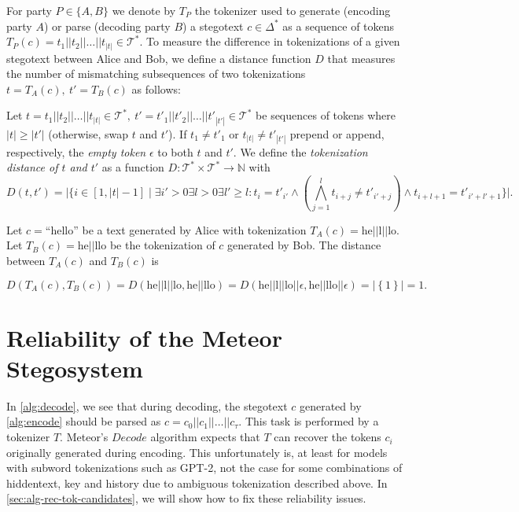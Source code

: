 For party $P \in \{A,B\}$ we denote by $T_P$ the tokenizer used to generate (encoding party $A$) or parse (decoding party $B$) a stegotext $c \in \Delta^*$ as a sequence of tokens $T_P(c) = t_1||t_2||\dots||t_{|t|} \in \mathcal{T}^*$.
To measure the difference in tokenizations of a given stegotext between Alice and Bob, we define a distance function $D$ that measures the number of mismatching subsequences of two tokenizations $t = T_A(c),~ t' = T_B(c)$ as follows:

\begin{definition}
Let $t = t_1 || t_2 || \dots || t_{|t|} \in \mathcal{T}^*,~ t' = t'_1 || t'_2 || \dots || t'_{|t'|} \in \mathcal{T}^*$ be sequences of tokens where $|t| \geq |t'|$ (otherwise, swap $t$ and $t'$).
If $t_1 \neq t'_1$ or $t_{|t|} \neq t'_{|t'|}$ prepend or append, respectively, the \emph{empty token} $\epsilon$ to both $t$ and $t'$.
We define the \emph{tokenization distance of $t$ and $t'$} as a function $D \colon \mathcal{T}^* \times \mathcal{T}^* \rightarrow \mathbb{N}$ with
$$D(t, t') = \big| \big\{ i \in [1, |t|-1] \mid \exists i' > 0 \exists l > 0 \exists l' \geq l: t_{i} = t'_{i'} \land \left( \bigwedge_{j=1}^{l} t_{i+j} \neq t'_{i'+j} \right) \land t_{i+l+1} = t'_{i'+l'+1} \big\} \big|.$$
\end{definition}

\begin{example}
Let $c = \textrm{``hello''}$ be a text generated by Alice with tokenization $T_A(c) = \textrm{he}||\textrm{l}||\textrm{lo}$.
Let $T_B(c) = \textrm{he}||\textrm{llo}$ be the tokenization of $c$ generated by Bob.
The distance between $T_A(c)$ and $T_B(c)$ is 

$$
D(T_A(c), T_B(c))
= D(\textrm{he}||\textrm{l}||\textrm{lo}, \textrm{he}||\textrm{llo})
= D(\textrm{he}||\textrm{l}||\textrm{lo}||\epsilon, \textrm{he}||\textrm{llo}||\epsilon)
= \left| \left\{ 1 \right\} \right| = 1.
$$
\end{example}

\section{Reliability of the Meteor Stegosystem}

In \autoref{alg:decode}, we see that during decoding, the stegotext $c$ generated by \autoref{alg:encode} should be parsed as $c = c_0 ||c_1 || \dots || c_{\tau}$.
This task is performed by a tokenizer $T$.
Meteor's $Decode$ algorithm expects that $T$ can recover the tokens $c_i$ originally generated during encoding.
This unfortunately is, at least for models with subword tokenizations such as GPT-2, not the case for some combinations of hiddentext, key and history due to ambiguous tokenization described above.
In \autoref{sec:alg-rec-tok-candidates}, we will show how to fix these reliability issues.

